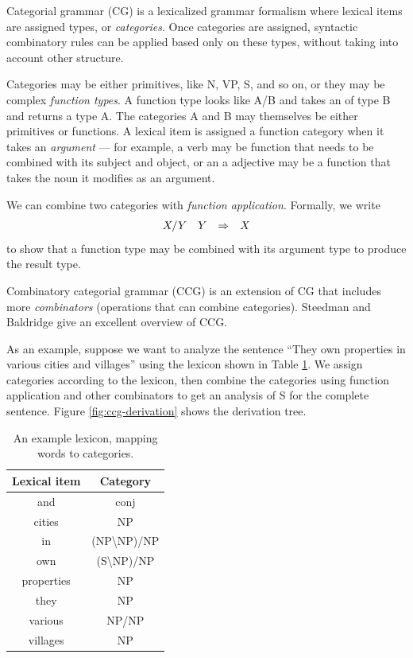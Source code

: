 \documentclass[a4paper]{article}
\begin{document}


Categorial grammar (CG) \cite{cg,bar-hillel-cg} is a lexicalized grammar formalism where lexical items are assigned types, or {\em categories}. Once categories are assigned, syntactic combinatory rules can be applied based only on these types, without taking into account other structure.

Categories may be either primitives, like N, VP, S, and so on, or they may be complex {\em function types}. A function type looks like A/B and takes an of type B and returns a type A. The categories A and B may themselves be either primitives or functions. A lexical item is assigned a function category when it takes an {\em argument} --- for example, a verb may be function that needs to be combined with its subject and object, or an a adjective may be a function that takes the noun it modifies as an argument.

We can combine two categories with {\em function application}. Formally, we write
\begin{equation}
\begin{array}{cccc} X/Y & Y & \Rightarrow & X \end{array}\label{eqn:forward-app}
\end{equation}
to show that a function type may be combined with its argument type to produce the result type.

Combinatory categorial grammar (CCG) is an extension of CG that includes more {\em combinators} (operations that can combine categories). Steedman and Baldridge  give an excellent overview of CCG.

As an example, suppose we want to analyze the sentence ``They own properties in various cities and villages'' using the lexicon shown in Table \ref{table:lexicon}. We assign categories according to the lexicon, then combine the categories using function application and other combinators to get an analysis of S for the complete sentence. Figure \ref{fig:ccg-derivation} shows the derivation tree.

\begin{table}
\centering
\begin{tabular}{|c|c|}
\hline
Lexical item & Category \\
\hline
and & conj \\
cities & NP \\
in &  (NP\textbackslash NP)/NP \\
own & (S\textbackslash NP)/NP \\
properties & NP \\
they & NP \\
various & NP/NP \\
villages & NP \\
\hline
\end{tabular}
\caption{An example lexicon, mapping words to categories.\label{table:lexicon}}
\end{table}
\end{document}
